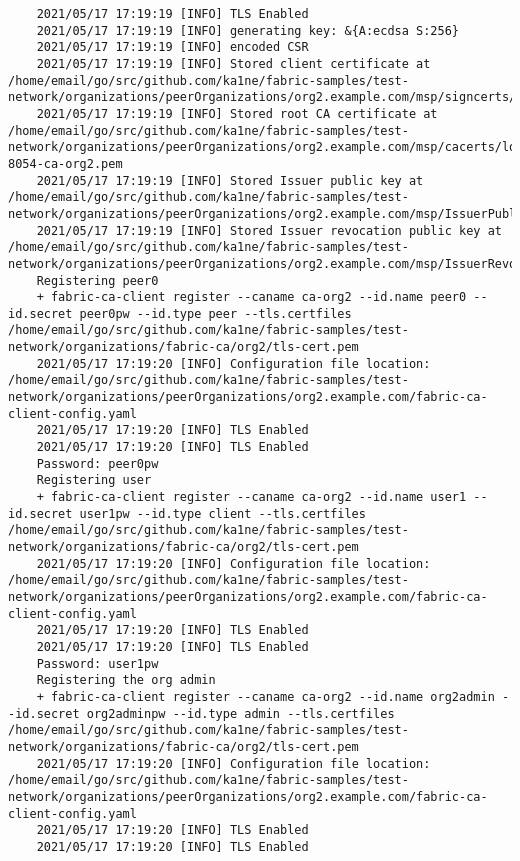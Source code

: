 \begin{lstlisting}
    2021/05/17 17:19:19 [INFO] TLS Enabled
    2021/05/17 17:19:19 [INFO] generating key: &{A:ecdsa S:256}
    2021/05/17 17:19:19 [INFO] encoded CSR
    2021/05/17 17:19:19 [INFO] Stored client certificate at /home/email/go/src/github.com/ka1ne/fabric-samples/test-network/organizations/peerOrganizations/org2.example.com/msp/signcerts/cert.pem
    2021/05/17 17:19:19 [INFO] Stored root CA certificate at /home/email/go/src/github.com/ka1ne/fabric-samples/test-network/organizations/peerOrganizations/org2.example.com/msp/cacerts/localhost-8054-ca-org2.pem
    2021/05/17 17:19:19 [INFO] Stored Issuer public key at /home/email/go/src/github.com/ka1ne/fabric-samples/test-network/organizations/peerOrganizations/org2.example.com/msp/IssuerPublicKey
    2021/05/17 17:19:19 [INFO] Stored Issuer revocation public key at /home/email/go/src/github.com/ka1ne/fabric-samples/test-network/organizations/peerOrganizations/org2.example.com/msp/IssuerRevocationPublicKey
    Registering peer0
    + fabric-ca-client register --caname ca-org2 --id.name peer0 --id.secret peer0pw --id.type peer --tls.certfiles /home/email/go/src/github.com/ka1ne/fabric-samples/test-network/organizations/fabric-ca/org2/tls-cert.pem
    2021/05/17 17:19:20 [INFO] Configuration file location: /home/email/go/src/github.com/ka1ne/fabric-samples/test-network/organizations/peerOrganizations/org2.example.com/fabric-ca-client-config.yaml
    2021/05/17 17:19:20 [INFO] TLS Enabled
    2021/05/17 17:19:20 [INFO] TLS Enabled
    Password: peer0pw
    Registering user
    + fabric-ca-client register --caname ca-org2 --id.name user1 --id.secret user1pw --id.type client --tls.certfiles /home/email/go/src/github.com/ka1ne/fabric-samples/test-network/organizations/fabric-ca/org2/tls-cert.pem
    2021/05/17 17:19:20 [INFO] Configuration file location: /home/email/go/src/github.com/ka1ne/fabric-samples/test-network/organizations/peerOrganizations/org2.example.com/fabric-ca-client-config.yaml
    2021/05/17 17:19:20 [INFO] TLS Enabled
    2021/05/17 17:19:20 [INFO] TLS Enabled
    Password: user1pw
    Registering the org admin
    + fabric-ca-client register --caname ca-org2 --id.name org2admin --id.secret org2adminpw --id.type admin --tls.certfiles /home/email/go/src/github.com/ka1ne/fabric-samples/test-network/organizations/fabric-ca/org2/tls-cert.pem
    2021/05/17 17:19:20 [INFO] Configuration file location: /home/email/go/src/github.com/ka1ne/fabric-samples/test-network/organizations/peerOrganizations/org2.example.com/fabric-ca-client-config.yaml
    2021/05/17 17:19:20 [INFO] TLS Enabled
    2021/05/17 17:19:20 [INFO] TLS Enabled

\end{lstlisting}
